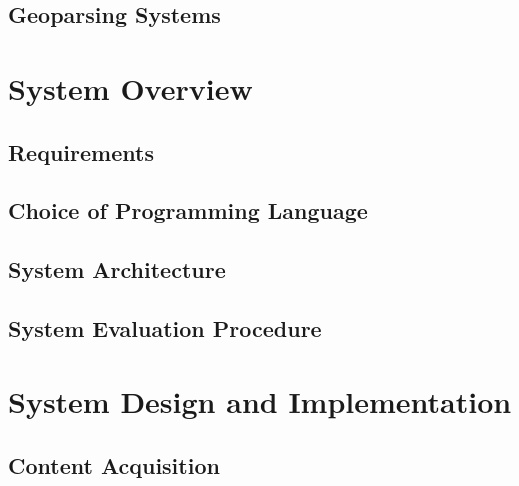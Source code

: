 \documentclass[12pt, a4paper]{report}
\begin{document}
\section{Geoparsing Systems}


\chapter{System Overview}

\section{Requirements}

\section{Choice of Programming Language}

\section{System Architecture}

\section{System Evaluation Procedure}


\chapter{System Design and Implementation}

\section{Content Acquisition}
\end{document}
